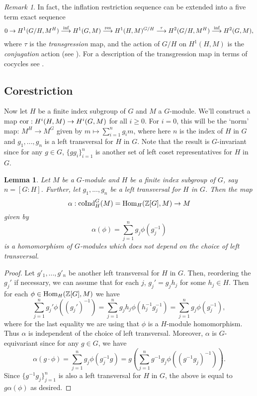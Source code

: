 \documentclass[11pt]{amsart}
\numberwithin{equation}{section}
\newtheorem{lemma}[equation]{Lemma}
\theoremstyle{remark}
\newtheorem{remark}[equation]{Remark}
\theoremstyle{remark}
\theoremstyle{remark}
\theoremstyle{definition}
\theoremstyle{definition}
\theoremstyle{definition}
\theoremstyle{definition}
\theoremstyle{definition}
\theoremstyle{definition}
\begin{document}
\begin{remark}
In fact, the inflation restriction sequence can be extended into a five term exact sequence
\[0\rightarrow H^1(G/H,M^H)\stackrel{\textup{inf}}{\longrightarrow}H^1(G,M)\stackrel{\textup{res}}{{\longrightarrow}}H^1(H,M)^{G/H}\stackrel{\tau}{{\longrightarrow}}H^2(G/H,M^H)\stackrel{\textup{inf}}{\longrightarrow}H^2(G,M),\]
where $\tau$ is the \textit{transgression} map, and the action of $G/H$ on $H^1(H,M)$ is the \textit{conjugation} action (see \cite[Construction 3.3.12]{MR2266528}). For a description of the transgression map in terms of cocycles see \cite[Proposition 1.6.6]{MR2392026}.  
\end{remark}

\subsection{Corestriction}

Now let $H$ be a finite index subgroup of $G$ and $M$ a $G$-module. We'll construct a map $\textup{cor}:H^i(H,M)\rightarrow H^i(G,M)$ for all $i\geq 0$. For $i=0$, this will be the `norm' map: $M^H\rightarrow M^G$ given by $m\mapsto \sum_{i=1}^ng_i m$, where here $n$ is the index of $H$ in $G$ and $g_1,...,g_n$ is a left transversal for $H$ in $G$. Note that the result is $G$-invariant since for any $g\in G$, $\{gg_i\}_{i=1}^n$ is another set of left coset representatives for $H$ in $G$. 

\begin{lemma} \label{norm of homs lem}
Let $M$ be a $G$-module and $H$ be a finite index subgroup of $G$, say $n=[G:H]$. Further, let $g_1,...,g_n$ be a left transversal for $H$ in $G$. Then the map
\[\alpha:\textup{coInd}_{H}^G(M)=\textup{Hom}_H(\mathbb{Z}[G],M)\rightarrow M\]
given by
\[\alpha(\phi)=\sum_{j=1}^ng_j\phi(g_{j}^{-1})\]
is a homomorphism of $G$-modules which does not  depend on the choice of left transversal. 
\end{lemma}

\begin{proof}
Let $g'_1,...,g'_n$ be another left transversal for $H$ in $G$. Then, reordering the $g_j'$ if necessary, we can assume that for each $j$, $g_j'=g_jh_j$ for some $h_j\in H$.  Then for each $\phi \in \textup{Hom}_H(\mathbb{Z}[G],M)$ we have
\[\sum_{j=1}^ng_{j}'\phi((g_{j}')^{-1})=\sum_{j=1}^ng_j h_j \phi(h_j^{-1}g_j^{-1})=\sum_{j=1}^ng_j\phi(g_{j}^{-1}),\]
where for the last equality we are using that $\phi$ is a $H$-module homomorphism. Thus $\alpha$ is independent of the choice of left transversal. 
Moreover, $\alpha$ is $G$-equivariant since for any $g\in G$, we have
\[\alpha(g\cdot \phi)=\sum_{j=1}^ng_j\phi(g_{j}^{-1}g)=g\left(\sum_{j=1}^ng^{-1}g_j\phi\left((g^{-1}g_j)^{-1}\right)\right).\]
Since $\{g^{-1}g_j\}_{j=1}^n$ is also a left transversal for $H$ in $G$, the above is equal to $g\alpha(\phi)$ as desired.
\end{proof}
\end{document}
